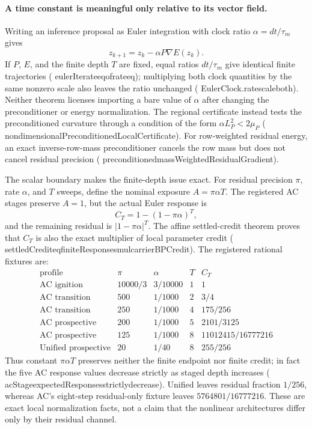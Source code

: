 \documentclass[11pt]{article}
\newcommand{\leanname}[1]{{\scriptsize\ttfamily
  \def\_{\textunderscore\allowbreak}#1}}
\begin{document}
\paragraph{A time constant is meaningful only relative to its vector field.}
Writing an inference proposal as Euler integration with clock ratio
$\alpha=dt/\tau_m$ gives
\[
 z_{k+1}=z_k-\alpha P\nabla E(z_k).
\]
If $P$, $E$, and the finite depth $T$ are fixed, equal ratios $dt/\tau_m$ give
identical finite trajectories
(\leanname{eulerIterate\_eq\_of\_rate\_eq}); multiplying both clock quantities by
the same nonzero scale also leaves the ratio unchanged
(\leanname{EulerClock.rate\_scale\_both}). Neither theorem licenses importing a
bare value of $\alpha$ after changing the preconditioner or energy normalization.
The regional certificate instead tests the preconditioned curvature through a
condition of the form $\alpha L_P^2<2\mu_P$
(\leanname{nondimensionalPreconditionedLocalCertificate}). For row-weighted
residual energy, an exact inverse-row-mass preconditioner cancels the row mass but
does not cancel residual precision
(\leanname{preconditioned\_massWeightedResidualGradient}).

The scalar boundary makes the finite-depth issue exact. For residual precision
$\pi$, rate $\alpha$, and $T$ sweeps, define the nominal exposure
$A=\pi\alpha T$. The registered AC stages preserve $A=1$, but the actual Euler
response is
\[
  C_T=1-(1-\pi\alpha)^T,
\]
and the remaining residual is $|1-\pi\alpha|^T$. The affine settled-credit theorem
proves that $C_T$ is also the exact multiplier of local parameter credit
(\leanname{settledCredit\_eq\_finiteResponse\_smul\_carrierBPCredit}). The
registered rational fixtures are:
\[
\begin{array}{c|c|c|c|c}
\text{profile}&\pi&\alpha&T&C_T\\ \hline
\text{AC ignition}&10000/3&3/10000&1&1\\
\text{AC transition}&500&1/1000&2&3/4\\
\text{AC transition}&250&1/1000&4&175/256\\
\text{AC prospective}&200&1/1000&5&2101/3125\\
\text{AC prospective}&125&1/1000&8&11012415/16777216\\
\text{Unified prospective}&20&1/40&8&255/256
\end{array}
\]
Thus constant $\pi\alpha T$ preserves neither the finite endpoint nor finite
credit; in fact the five AC response values decrease strictly as staged depth
increases (\leanname{acStage\_expectedResponses\_strictly\_decrease}). Unified
leaves residual fraction $1/256$, whereas AC's eight-step residual-only fixture
leaves $5764801/16777216$. These are exact local normalization facts, not a claim
that the nonlinear architectures differ only by their residual channel.
\end{document}
